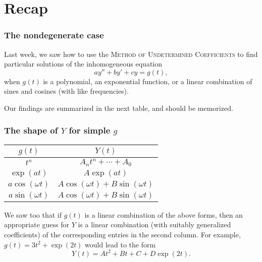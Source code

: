 \def\encoding{UTF-8}

\def\mytitle{Undetermined Coefficients, II}
\def\subtitle{Products and degeneracy}
\def\affiliation{The College of Idaho}
\def\myauthor{Math 352 Differential Equations}
\def\mydate{31 March 2014}
\def\latexmode{beamer}
\def\fonttheme{structurebold}
\def\colortheme{crane}
\def\theme{Szeged}

\def\htmlheaderlevel{2}
\section{Recap}
\label{recap}

\begin{frame}

\frametitle{The nondegenerate case}
\label{thenondegeneratecase}

Last week, we saw how to use the 
\textsc{Method of Undetermined Coefficients}
 to find particular solutions of the inhomogeneous equation
\[
    ay'' + by' + cy = g(t),
\]
when $ g(t) $ is a polynomial, an exponential function, or a linear combination of sines and cosines (with like frequencies).

Our findings are summarized in the next table, and should be memorized.

\end{frame}

\begin{frame}

\frametitle{The shape of $Y$ for simple $ g $}
\label{theshapeofyforsimpleg}

\begin{table}[htbp]
\begin{minipage}{\linewidth}
\setlength{\tymax}{0.5\linewidth}
\centering
\small
\begin{tabulary}{\textwidth}{@{}CC@{}} \toprule
$ g(t) $&$ Y(t) $\\
\midrule
$ t^n $&$ A_n t^n + \cdots + A_ 0 $\\
$ \exp{(at)} $&$ A \exp{(at)} $\\
$ a \cos{(\omega t)} $&$ A \cos{(\omega t)} + B \sin{(\omega t)} $\\
$ a \sin{(\omega t)} $&$ A \cos{(\omega t)} + B \sin{(\omega t)} $\\

\bottomrule

\end{tabulary}
\end{minipage}
\end{table}


We saw too that if $ g(t) $ is a linear combination of the above forms, then an appropriate guess for $ Y $ is a linear combination (with suitably generalized coefficients) of the corresponding entries in the second column. For example, $ g(t) = 3t^2 + \exp{(2t)} $ would lead to the form
\[
    Y(t) = At^2 + Bt + C + D \exp{(2t)}.
\]

\end{frame}

